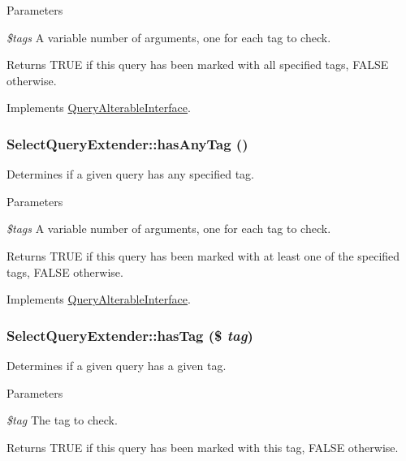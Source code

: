 \begin{DoxyParams}{Parameters}
\item[{\em \$tags}]A variable number of arguments, one for each tag to check.\end{DoxyParams}
\begin{DoxyReturn}{Returns}
TRUE if this query has been marked with all specified tags, FALSE otherwise. 
\end{DoxyReturn}


Implements \hyperlink{interfaceQueryAlterableInterface_a752e1b07ff69e4807fcaeab1aa172c57}{QueryAlterableInterface}.\hypertarget{classSelectQueryExtender_a6b6aec8ae5f5c3a98637db9d6e156008}{
\subsubsection[{hasAnyTag}]{\setlength{\rightskip}{0pt plus 5cm}SelectQueryExtender::hasAnyTag ()}}
\label{classSelectQueryExtender_a6b6aec8ae5f5c3a98637db9d6e156008}
Determines if a given query has any specified tag.


\begin{DoxyParams}{Parameters}
\item[{\em \$tags}]A variable number of arguments, one for each tag to check.\end{DoxyParams}
\begin{DoxyReturn}{Returns}
TRUE if this query has been marked with at least one of the specified tags, FALSE otherwise. 
\end{DoxyReturn}


Implements \hyperlink{interfaceQueryAlterableInterface_ae52ceaffc7ad7cf7f2b0542e8d55b3f1}{QueryAlterableInterface}.\hypertarget{classSelectQueryExtender_ab9dd51674086089c405126e6508e232d}{
\subsubsection[{hasTag}]{\setlength{\rightskip}{0pt plus 5cm}SelectQueryExtender::hasTag (\$ {\em tag})}}
\label{classSelectQueryExtender_ab9dd51674086089c405126e6508e232d}
Determines if a given query has a given tag.


\begin{DoxyParams}{Parameters}
\item[{\em \$tag}]The tag to check.\end{DoxyParams}
\begin{DoxyReturn}{Returns}
TRUE if this query has been marked with this tag, FALSE otherwise. 
\end{DoxyReturn}



